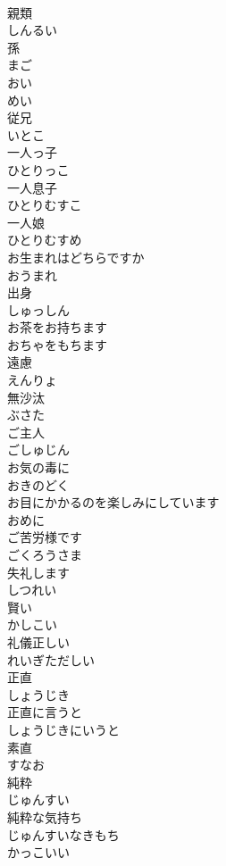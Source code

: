 \documentclass[8pt]{extreport}
\begin{document}
\begin{CJK}{UTF8}{min}
\\	親類	
\\	しんるい
\\	孫	
\\	まご
\\	おい	
\\	めい	
\\	従兄	
\\	いとこ
\\	一人っ子	
\\	ひとりっこ
\\	一人息子	
\\	ひとりむすこ
\\	一人娘	
\\	ひとりむすめ
\\	お生まれはどちらですか	
\\	おうまれ
\\	出身	
\\	しゅっしん
\\	お茶をお持ちます	
\\	おちゃをもちます
\\	遠慮	
\\	えんりょ
\\	無沙汰	
\\	ぶさた
\\	ご主人	
\\	ごしゅじん
\\	お気の毒に	
\\	おきのどく
\\	お目にかかるのを楽しみにしています	
\\	おめに
\\	ご苦労様です	
\\	ごくろうさま
\\	失礼します	
\\	しつれい
\\	賢い	
\\	かしこい
\\	礼儀正しい	
\\	れいぎただしい
\\	正直	
\\	しょうじき
\\	正直に言うと	
\\	しょうじきにいうと
\\	素直	
\\	すなお
\\	純粋	
\\	じゅんすい
\\	純粋な気持ち	
\\	じゅんすいなきもち
\\	かっこいい	

\end{CJK}
\end{document}
